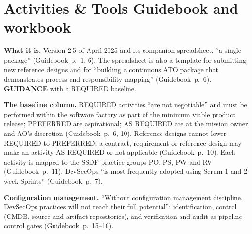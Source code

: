 \documentclass[11pt,letterpaper,twoside,openany]{memoir}
\newcommand{\pg}[2]{{\small(#1~p.~#2)}}          %
\newcommand{\st}[1]{{\sffamily\scriptsize\bfseries #1}}   %
\begin{document}
\section{Activities \& Tools Guidebook and workbook}\label{sec:guidebook}
\textbf{What it is.} Version 2.5 of April 2025 and its companion spreadsheet, ``a single package''
\pg{Guidebook}{1, 6}. The spreadsheet is also a template for submitting new reference designs and for ``building a
continuous ATO package that demonstrates process and responsibility mapping'' \pg{Guidebook}{6}. \st{GUIDANCE} with a
REQUIRED baseline.

\textbf{The baseline column.} REQUIRED activities ``are not negotiable'' and must be performed within the software
factory as part of the minimum viable product release; PREFERRED are aspirational; AS REQUIRED are at the mission owner
and AO's discretion \pg{Guidebook}{6, 10}. Reference designs cannot lower REQUIRED to PREFERRED; a contract, requirement
or reference design may make an activity AS REQUIRED or not applicable \pg{Guidebook}{10}. Each activity is mapped to
the SSDF practice groups PO, PS, PW and RV \pg{Guidebook}{11}. DevSecOps ``is most frequently adopted using Scrum 1 and 2
week Sprints'' \pg{Guidebook}{7}.

\textbf{Configuration management.} ``Without configuration management discipline, DevSecOps practices will not reach
their full potential'': identification, control (CMDB, source and artifact repositories), and verification and audit as
pipeline control gates \pg{Guidebook}{15--16}.
\end{document}
